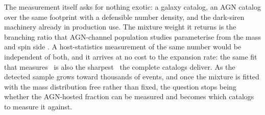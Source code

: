 The measurement itself asks for nothing exotic: a galaxy catalog, an AGN
catalog over the same footprint with a defensible number density, and the
dark-siren machinery already in production use. The mixture weight it returns
is the branching ratio that AGN-channel population studies parameterise from
the mass and spin side \citep{FordMcKernan2022, TagawaHaimanKocsis2020}. A
host-statistics measurement of the same number would be independent of both,
and it arrives at no cost to the expansion rate: the same fit that measures
\fagn\ is also the sharpest \Hz\ the complete catalogs deliver. As
the detected sample grows toward thousands of events, and once the mixture
is fitted with the mass distribution free rather than fixed, the question
stops being whether the AGN-hosted fraction can be measured and becomes
which catalogs to measure it against.
